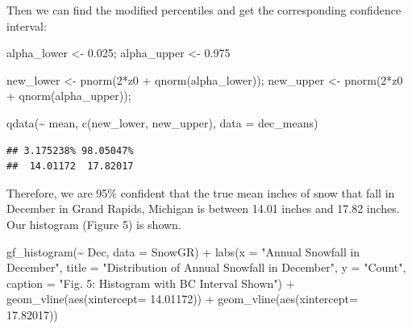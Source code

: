 \documentclass[12pt]{article}
\newenvironment{Shaded}{\begin{snugshade}}{\end{snugshade}}
\newcommand{\AttributeTok}[1]{\textcolor[rgb]{0.77,0.63,0.00}{#1}}
\newcommand{\DecValTok}[1]{\textcolor[rgb]{0.00,0.00,0.81}{#1}}
\newcommand{\FloatTok}[1]{\textcolor[rgb]{0.00,0.00,0.81}{#1}}
\newcommand{\FunctionTok}[1]{\textcolor[rgb]{0.00,0.00,0.00}{#1}}
\newcommand{\NormalTok}[1]{#1}
\newcommand{\OtherTok}[1]{\textcolor[rgb]{0.56,0.35,0.01}{#1}}
\newcommand{\SpecialCharTok}[1]{\textcolor[rgb]{0.00,0.00,0.00}{#1}}
\newcommand{\StringTok}[1]{\textcolor[rgb]{0.31,0.60,0.02}{#1}}
\begin{document}
Then we can find the modified percentiles and get the corresponding
confidence interval:

\begin{Shaded}
\begin{Highlighting}[]
\NormalTok{alpha\_lower }\OtherTok{\textless{}{-}} \FloatTok{0.025}\NormalTok{; alpha\_upper }\OtherTok{\textless{}{-}} \FloatTok{0.975}

\NormalTok{new\_lower }\OtherTok{\textless{}{-}} \FunctionTok{pnorm}\NormalTok{(}\DecValTok{2}\SpecialCharTok{*}\NormalTok{z0 }\SpecialCharTok{+} \FunctionTok{qnorm}\NormalTok{(alpha\_lower)); }
\NormalTok{new\_upper }\OtherTok{\textless{}{-}} \FunctionTok{pnorm}\NormalTok{(}\DecValTok{2}\SpecialCharTok{*}\NormalTok{z0 }\SpecialCharTok{+} \FunctionTok{qnorm}\NormalTok{(alpha\_upper)); }

\FunctionTok{qdata}\NormalTok{(}\SpecialCharTok{\textasciitilde{}}\NormalTok{ mean, }\FunctionTok{c}\NormalTok{(new\_lower, new\_upper), }\AttributeTok{data =}\NormalTok{ dec\_means)}
\end{Highlighting}
\end{Shaded}

\begin{verbatim}
## 3.175238% 98.05047% 
##  14.01172  17.82017
\end{verbatim}

Therefore, we are 95\% confident that the true mean inches of snow that
fall in December in Grand Rapids, Michigan is between 14.01 inches and
17.82 inches. Our histogram (Figure 5) is shown.

\begin{Shaded}
\begin{Highlighting}[]
\FunctionTok{gf\_histogram}\NormalTok{(}\SpecialCharTok{\textasciitilde{}}\NormalTok{ Dec, }\AttributeTok{data =}\NormalTok{ SnowGR) }\SpecialCharTok{+}
  \FunctionTok{labs}\NormalTok{(}\AttributeTok{x =} \StringTok{"Annual Snowfall in December"}\NormalTok{, }
       \AttributeTok{title =} \StringTok{"Distribution of Annual Snowfall in December"}\NormalTok{, }\AttributeTok{y =} \StringTok{"Count"}\NormalTok{,}
       \AttributeTok{caption =} \StringTok{"Fig. 5: Histogram with BC Interval Shown"}\NormalTok{) }\SpecialCharTok{+}
  \FunctionTok{geom\_vline}\NormalTok{(}\FunctionTok{aes}\NormalTok{(}\AttributeTok{xintercept=} \FloatTok{14.01172}\NormalTok{)) }\SpecialCharTok{+}
  \FunctionTok{geom\_vline}\NormalTok{(}\FunctionTok{aes}\NormalTok{(}\AttributeTok{xintercept=} \FloatTok{17.82017}\NormalTok{))}
\end{Highlighting}
\end{Shaded}
\end{document}
